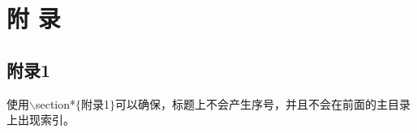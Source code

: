\chapter*{附\texorpdfstring{\qquad}{} 录}
\thispagestyle{main}

\section*{附录1}

使用$\backslash$section*$\{$附录1$\}$可以确保，标题上不会产生序号，并且不会在前面的主目录上出现索引。